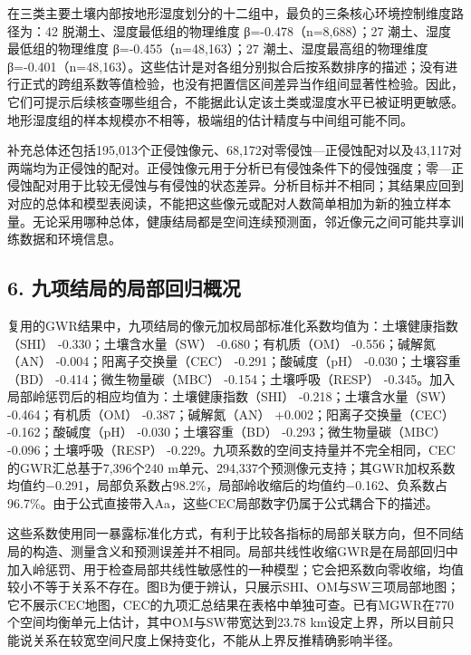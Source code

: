 \documentclass[
  a4paper,
  12pt]{ctexart}
\begin{document}
在三类主要土壤内部按地形湿度划分的十二组中，最负的三条核心环境控制维度路径为：42
脱潮土、湿度最低组的物理维度 β=-0.478（n=8,688）；27
潮土、湿度最低组的物理维度 β=-0.455（n=48,163）；27
潮土、湿度最高组的物理维度
β=-0.401（n=48,163）。这些估计是对各组分别拟合后按系数排序的描述；没有进行正式的跨组系数等值检验，也没有把置信区间差异当作组间显著性检验。因此，它们可提示后续核查哪些组合，不能据此认定该土类或湿度水平已被证明更敏感。地形湿度组的样本规模亦不相等，极端组的估计精度与中间组可能不同。

补充总体还包括195,013个正侵蚀像元、68,172对零侵蚀---正侵蚀配对以及43,117对两端均为正侵蚀的配对。正侵蚀像元用于分析已有侵蚀条件下的侵蚀强度；零---正侵蚀配对用于比较无侵蚀与有侵蚀的状态差异。分析目标并不相同；其结果应回到对应的总体和模型表阅读，不能把这些像元或配对人数简单相加为新的独立样本量。无论采用哪种总体，健康结局都是空间连续预测面，邻近像元之间可能共享训练数据和环境信息。

\hypertarget{ux4e5dux9879ux7ed3ux5c40ux7684ux5c40ux90e8ux56deux5f52ux6982ux51b5}{%
\subsection{6.
九项结局的局部回归概况}\label{ux4e5dux9879ux7ed3ux5c40ux7684ux5c40ux90e8ux56deux5f52ux6982ux51b5}}

复用的GWR结果中，九项结局的像元加权局部标准化系数均值为：土壤健康指数（SHI）
-0.330；土壤含水量（SW） -0.680；有机质（OM） -0.556；碱解氮（AN）
-0.004；阳离子交换量（CEC） -0.291；酸碱度（pH） -0.030；土壤容重（BD）
-0.414；微生物量碳（MBC） -0.154；土壤呼吸（RESP）
-0.345。加入局部岭惩罚后的相应均值为：土壤健康指数（SHI）
-0.218；土壤含水量（SW） -0.464；有机质（OM） -0.387；碱解氮（AN）
+0.002；阳离子交换量（CEC） -0.162；酸碱度（pH） -0.030；土壤容重（BD）
-0.293；微生物量碳（MBC） -0.096；土壤呼吸（RESP）
-0.229。九项系数的空间支持量并不完全相同，CEC的GWR汇总基于7,396个240
m单元、294,337个预测像元支持；其GWR加权系数均值约−0.291，局部负系数占98.2\%，局部岭收缩后的均值约−0.162、负系数占96.7\%。由于公式直接带入Aa，这些CEC局部数字仍属于公式耦合下的描述。

这些系数使用同一暴露标准化方式，有利于比较各指标的局部关联方向，但不同结局的构造、测量含义和预测误差并不相同。局部共线性收缩GWR是在局部回归中加入岭惩罚、用于检查局部共线性敏感性的一种模型；它会把系数向零收缩，均值较小不等于关系不存在。图B为便于辨认，只展示SHI、OM与SW三项局部地图；它不展示CEC地图，CEC的九项汇总结果在表格中单独可查。已有MGWR在770个空间均衡单元上估计，其中OM与SW带宽达到23.78
km设定上界，所以目前只能说关系在较宽空间尺度上保持变化，不能从上界反推精确影响半径。
\end{document}
